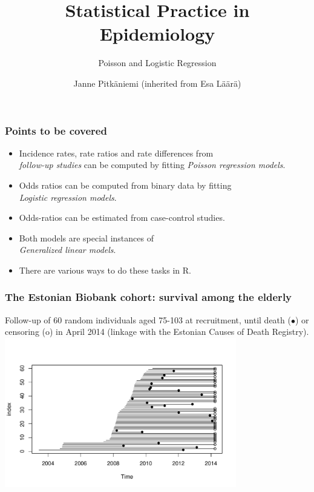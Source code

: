 \documentclass[handout,12pt,dvipsnames,t]{beamer}
\title{Statistical Practice in Epidemiology \newline }
\subtitle{Poisson and Logistic Regression} %
\author{Janne Pitk\"aniemi \newline \newline (inherited from Esa L\"a\"ar\"a) }
\date{}
\begin{document}
\lstset{basicstyle=\footnotesize}




\maketitle




\begin{frame}[fragile]
\frametitle{Points to be covered}

\begin{itemize}
\item Incidence rates, rate ratios and rate differences from\\ {\it follow-up studies}
 can be computed by fitting {\it Poisson regression models}.
\item Odds ratios can be computed from binary data by fitting \\ {\it Logistic regression models}.
\item Odds-ratios can be estimated from case-control studies.
\item Both models are special instances of \\
{\it Generalized linear models}.
\item There are various ways to do these tasks in R.
\end{itemize}

\end{frame}

\begin{frame}
\frametitle{The Estonian Biobank cohort: survival among the elderly}
Follow-up of 60 random individuals aged 75-103 at recruitment, until death ($\bullet$) or censoring (o) in April 2014 (linkage with the Estonian Causes of Death Registry). \\[-0.5cm]
\includegraphics[height=6.5cm]{over75lines}
\end{frame}
\end{document}
